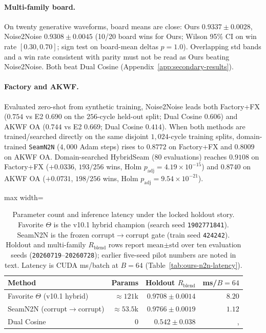 \paragraph{Multi-family board.}
On twenty generative waveforms, board means are close:
Ours $0.9337{\pm}0.0028$, Noise2Noise $0.9308{\pm}0.0045$
(10/20 board wins for Ours; Wilson 95\% CI on win rate $[0.30,0.70]$; sign test on board-mean deltas $p{=}1.0$).
Overlapping std bands and a win rate consistent with parity must not be read as Ours beating Noise2Noise.
Both beat Dual Cosine (Appendix~\ref{app:secondary-results}).

\paragraph{Factory and AKWF.}
Evaluated zero-shot from synthetic training, Noise2Noise leads both Factory+FX ($0.754$ vs E2 $0.690$ on the $256$-cycle held-out split; Dual Cosine $0.606$) and AKWF OA ($0.744$ vs E2 $0.669$; Dual Cosine $0.414$).
When both methods are trained/searched directly on the same disjoint $1{,}024$-cycle training splits, domain-trained \texttt{SeamN2N} ($4{,}000$ Adam steps) rises to $0.8772$ on Factory+FX and $0.8009$ on AKWF OA. Domain-searched HybridSeam ($80$ evaluations) reaches $\mathbf{0.9108}$ on Factory+FX ($+0.0336$, $193/256$ wins, Holm $p_{\mathrm{adj}}{=}4.19{\times}10^{-15}$) and $\mathbf{0.8740}$ on AKWF OA ($+0.0731$, $198/256$ wins, Holm $p_{\mathrm{adj}}{=}9.54{\times}10^{-21}$).

\begin{table}[htbp]
  \centering
  \caption{Parameter count and inference latency under the locked holdout story.
    Favorite $\Theta$ is the v10.1 hybrid champion (search seed \texttt{1902771841}).
    SeamN2N is the frozen corrupt$\to$corrupt gate (train seed \texttt{424242}).
    Holdout and multi-family $R_{\mathrm{blend}}$ rows report mean$\pm$std over ten evaluation seeds (\texttt{20260719}--\texttt{20260728}); earlier five-seed pilot numbers are noted in text.
    Latency is CUDA ms/batch at $B{=}64$ (Table~\ref{tab:ours-n2n-latency}).}
  \label{tab:param-fairness}
  \setlength{\tabcolsep}{4pt}
  \begin{adjustbox}{max width=\columnwidth}
\begin{tabular}{@{}lrrr@{}}
    \toprule
    Method & Params & Holdout $R_{\mathrm{blend}}$ & ms/$B{=}64$ \\
    \midrule
    Favorite $\Theta$ (v10.1 hybrid) & ${\approx}121$k & $0.9708{\pm}0.0014$ & $8.20$ \\
    SeamN2N (corrupt$\to$corrupt) & ${\approx}53.5$k & $0.9766{\pm}0.0019$ & $1.12$ \\
    Dual Cosine & $0$ & $0.542{\pm}0.038$ &, \\
    \bottomrule
  \end{tabular}
\end{adjustbox}
\end{table}

